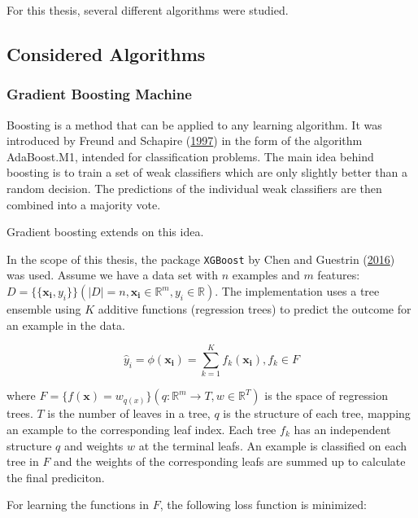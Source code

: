 \documentclass[
  11pt,
  a4paper,
  DIV=12,captions=tableheading,oneside]{scrbook}
\begin{document}
For this thesis, several different algorithms were studied.

\hypertarget{considered-algorithms}{%
\subsection{Considered Algorithms}\label{considered-algorithms}}

\hypertarget{gradient-boosting-machine}{%
\subsubsection{Gradient Boosting Machine}\label{gradient-boosting-machine}}

Boosting is a method that can be applied to any learning algorithm. It was introduced by Freund and Schapire (\protect\hyperlink{ref-freund1997decision}{1997}) in the form of the algorithm AdaBoost.M1, intended for classification problems. The main idea behind boosting is to train a set of weak classifiers which are only slightly better than a random decision. The predictions of the individual weak classifiers are then combined into a majority vote.

Gradient boosting extends on this idea.

In the scope of this thesis, the package \texttt{XGBoost} by Chen and Guestrin (\protect\hyperlink{ref-chen2016xgboost}{2016}) was used. Assume we have a data set with \(n\) examples and \(m\) features: \(D = \{\{\mathbf{x_i}, y_i\}\} ( |D| = n, \mathbf{x_i} \in \mathbb{R}^m, y_i \in \mathbb{R})\). The implementation uses a tree ensemble using \(K\) additive functions (regression trees) to predict the outcome for an example in the data.

\begin{equation}
\hat{y}_i = \phi(\mathbf{x_i}) = \sum_{k=1}^K f_k(\mathbf{x_i}), f_k \in F
\label{eq:gbm-ensemble}
\end{equation}

where \(F = \{f(\mathbf{x}) = w_{q(x)}\} (q: \mathbb{R}^m \rightarrow T, w \in \mathbb{R}^T)\) is the space of regression trees. \(T\) is the number of leaves in a tree, \(q\) is the structure of each tree, mapping an example to the corresponding leaf index. Each tree \(f_k\) has an independent structure \(q\) and weights \(w\) at the terminal leafs. An example is classified on each tree in \(F\) and the weights of the corresponding leafs are summed up to calculate the final prediciton.

For learning the functions in \(F\), the following loss function is minimized:
\end{document}
